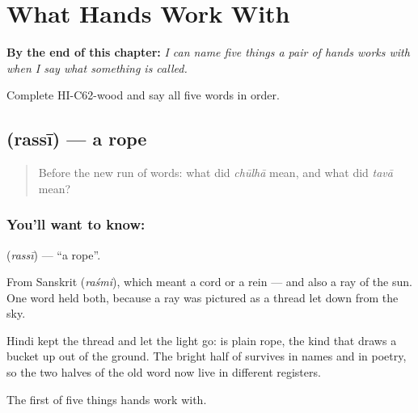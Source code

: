 
\chapter{What Hands Work With}
\label{ch:hi-what-hands-work-with}

\begin{chapteropening}
\textbf{By the end of this chapter:} \emph{I can name five things a pair of hands works with when I say what something is called.}

Complete HI-C62-wood and say all five words in order.
\end{chapteropening}

\section[\texorpdfstring{\hi{रस्सी} (rassī)}{रस्सी (rassī)}]{ (rassī) — a rope}

\label{lesson:HI-C62-rope}



\begin{quote}
Before the new run of words: what did \emph{chūlhā} mean, and what did \emph{tavā} mean?
\end{quote}

\subsection*{You'll want to know: }
\textbf{} (\emph{rassī}) — \textquotedblleft{}a rope\textquotedblright{}.

From Sanskrit  (\emph{raśmi}), which meant a cord or a rein — and also a ray of the sun. One word held both, because a ray was pictured as a thread let down from the sky.

Hindi kept the thread and let the light go:  is plain rope, the kind that draws a bucket up out of the ground. The bright half of  survives in names and in poetry, so the two halves of the old word now live in different registers.

\begin{grammarlens}[title={What you've built}]
The first of five things hands work with.
\end{grammarlens}

